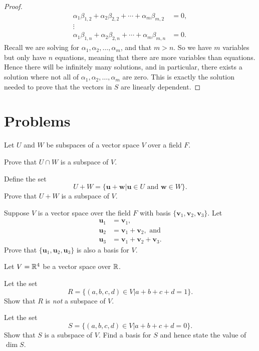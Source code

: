 \begin{proof}
\begin{align*}
        \alpha_1\beta_{1,2} + \alpha_2\beta_{2,2} + \cdots + \alpha_m\beta_{m,2} &= 0,\\
        \vdots\\
        \alpha_1\beta_{1,n} + \alpha_2\beta_{2,n} + \cdots + \alpha_m\beta_{m,n} &= 0.
    \end{align*}
    Recall we are solving for $\alpha_1, \alpha_2, \dots, \alpha_m$, and that $m > n$. So we have $m$ variables but only have $n$ equations, meaning that there are more variables than equations. Hence there will be infinitely many solutions, and in particular, there exists a solution where not all of $\alpha_1, \alpha_2, \dots, \alpha_m$ are zero. This is exactly the solution needed to prove that the vectors in $S$ are linearly dependent.
\end{proof}

\newpage

\section{Problems}
\begin{problem}
    Let $U$ and $W$ be subspaces of a vector space $V$ over a field $F$.
    \begin{partquestions}{\alph*}
        \item Prove that $U \cap W$ is a subspace of $V$.
        \item Define the set
        \[
            U + W = \{\textbf{u} + \textbf{w} \vert \textbf{u} \in U \text{ and } \textbf{w} \in W\}.
        \]
        Prove that $U + W$ is a subspace of $V$.
    \end{partquestions}
\end{problem}

\begin{problem}
    Suppose $V$ is a vector space over the field $F$ with basis $\{\textbf{v}_1, \textbf{v}_2, \textbf{v}_3\}$. Let
    \begin{align*}
        \textbf{u}_1 &= \textbf{v}_1,\\
        \textbf{u}_2 &= \textbf{v}_1 + \textbf{v}_2, \text{ and}\\
        \textbf{u}_3 &= \textbf{v}_1 + \textbf{v}_2 + \textbf{v}_3.
    \end{align*}
    Prove that $\{\textbf{u}_1, \textbf{u}_2, \textbf{u}_3\}$ is also a basis for $V$.
\end{problem}

\begin{problem}
    Let $V = \mathbb{R}^4$ be a vector space over $\mathbb{R}$.
    \begin{partquestions}{\alph*}
        \item Let the set
        \[
            R = \{(a, b, c, d) \in V \vert a + b + c + d = 1\}.
        \]
        Show that $R$ is \textit{not} a subspace of $V$.

        \item Let the set
        \[
            S = \{(a, b, c, d) \in V \vert a + b + c + d = 0\}.
        \]
        Show that $S$ is a subspace of $V$. Find a basis for $S$ and hence state the value of $\dim{S}$.
    \end{partquestions}
\end{problem}

